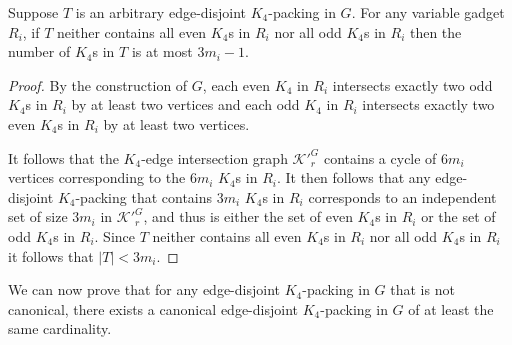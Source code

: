\begin{prop}
\label{prop:krpacking_kfour_evenoddareonlymaximum}
Suppose $T$ is an arbitrary edge-disjoint $K_4$-packing in $G$. For any variable gadget $R_i$, if $T$ neither contains all even $K_4$s in $R_i$ nor all odd $K_4$s in $R_i$ then the number of $K_4$s in $T$ is at most $3 m_i - 1$.
\end{prop}
\begin{proof}
By the construction of $G$, each even $K_4$ in $R_i$ intersects exactly two odd $K_4$s in $R_i$ by at least two vertices and each odd $K_4$ in $R_i$ intersects exactly two even $K_4$s in $R_i$ by at least two vertices. 

It follows that the $K_4$-edge intersection graph ${\mathcal{K}'}_r^G$ contains a cycle of $6 m_i$ vertices corresponding to the $6 m_i$ $K_4$s in $R_i$. It then follows that any edge-disjoint $K_4$-packing that contains $3 m_i$ $K_4$s in $R_i$ corresponds to an independent set of size $3 m_i$ in ${\mathcal{K}'}_r^G$, and thus is either the set of even $K_4$s in $R_i$ or the set of odd $K_4$s in $R_i$. Since $T$ neither contains all even $K_4$s in $R_i$ nor all odd $K_4$s in $R_i$ it follows that $|T| < 3m_i$.
\end{proof}

We can now prove that for any edge-disjoint $K_4$-packing in $G$ that is not canonical, there exists a canonical edge-disjoint $K_4$-packing in $G$ of at least the same cardinality.

